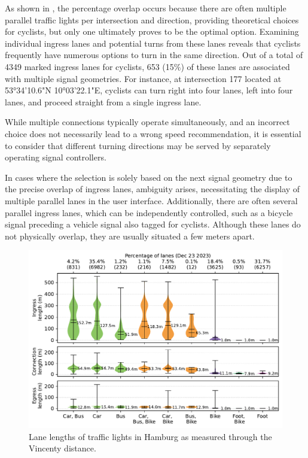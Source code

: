 As shown in , the percentage overlap occurs because there are often multiple parallel traffic lights per intersection and direction, providing theoretical choices for cyclists, but only one ultimately proves to be the optimal option. Examining individual ingress lanes and potential turns from these lanes reveals that cyclists frequently have numerous options to turn in the same direction. Out of a total of 4349 marked ingress lanes for cyclists, 653 (15\%) of these lanes are associated with multiple signal geometries. For instance, at intersection 177 located at 53°34'10.6"N 10°03'22.1"E, cyclists can turn right into four lanes, left into four lanes, and proceed straight from a single ingress lane.

While multiple connections typically operate simultaneously, and an incorrect choice does not necessarily lead to a wrong speed recommendation, it is essential to consider that different turning directions may be served by separately operating signal controllers.

In cases where the selection is solely based on the next signal geometry due to the precise overlap of ingress lanes, ambiguity arises, necessitating the display of multiple parallel lanes in the user interface. Additionally, there are often several parallel ingress lanes, which can be independently controlled, such as a bicycle signal preceding a vehicle signal also tagged for cyclists. Although these lanes do not physically overlap, they are usually situated a few meters apart.

\begin{figure}[t]
\centering
\includegraphics[width=\linewidth]{images/lanes-lengths.pdf}
\caption{Lane lengths of traffic lights in Hamburg as measured through the Vincenty distance.}
\label{fig:ingress-lane-lengths}
\end{figure}

